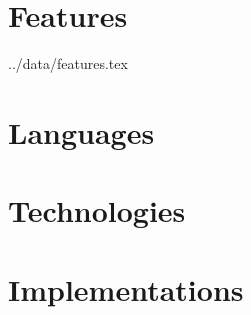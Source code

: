 \documentclass{article}
\begin{document}
\tableofcontents

\pagebreak

\section{Features}

 {../data/features.tex}

\pagebreak


\section{Languages}



\pagebreak


\section{Technologies}



\pagebreak


\section{Implementations}


\end{document}
